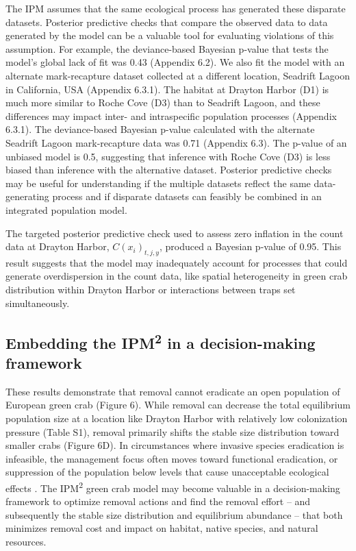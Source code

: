 \documentclass{article}
\begin{document}
The IPM assumes that the same ecological process has generated these disparate datasets. Posterior predictive checks that compare the observed data to data generated by the model can be a valuable tool for evaluating violations of this assumption. For example, the deviance-based Bayesian p-value that tests the model's global lack of fit was 0.43 (Appendix 6.2). We also fit the model with an alternate mark-recapture dataset collected at a different location, Seadrift Lagoon in California, USA (Appendix 6.3.1). The habitat at Drayton Harbor (D1) is much more similar to Roche Cove (D3) than to Seadrift Lagoon, and these differences may impact inter- and intraspecific population processes (Appendix 6.3.1). The deviance-based Bayesian p-value calculated with the alternate Seadrift Lagoon mark-recapture data was 0.71 (Appendix 6.3). The p-value of an unbiased model is 0.5, suggesting that inference with Roche Cove (D3) is less biased than inference with the alternative dataset. Posterior predictive checks may be useful for understanding if the multiple datasets reflect the same data-generating process and if disparate datasets can feasibly be combined in an integrated population model. 

The targeted posterior predictive check used to assess zero inflation in the count data at Drayton Harbor, $C(x_i)_{t,j,y}$, produced a Bayesian p-value of 0.95. This result suggests that the model may inadequately account for processes that could generate overdispersion in the count data, like spatial heterogeneity in green crab distribution within Drayton Harbor or interactions between traps set simultaneously. 

\subsection{Embedding the IPM\textsuperscript{2} in a decision-making framework}

These results demonstrate that removal cannot eradicate an open population of European green crab (Figure 6). While removal can decrease the total equilibrium population size at a location like Drayton Harbor with relatively low colonization pressure (Table S1), removal primarily shifts the stable size distribution toward smaller crabs (Figure 6D). In circumstances where invasive species eradication is infeasible, the management focus often moves toward functional eradication, or suppression of the population below levels that cause unacceptable ecological effects \parencite{green2021functional}. The IPM\textsuperscript{2} green crab model may become valuable in a decision-making framework to optimize removal actions and find the removal effort – and subsequently the stable size distribution and equilibrium abundance – that both minimizes removal cost and impact on habitat, native species, and natural resources. 
\end{document}
